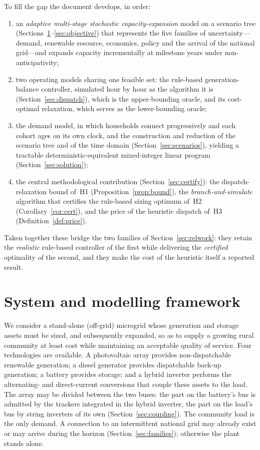 \documentclass[11pt,a4paper]{article}
\theoremstyle{plain}
\theoremstyle{definition}
\begin{document}
To fill the gap the document develops, in order:
\begin{enumerate}[leftmargin=1.8em,itemsep=1pt]
  \item an \emph{adaptive multi-stage stochastic capacity-expansion} model on a scenario
  tree (Sections~\ref{sec:framework}--\ref{sec:objective}) that represents the five
  families of uncertainty---demand, renewable resource, economics, policy and the arrival
  of the national grid---and expands capacity incrementally at milestone years under
  non-anticipativity;
  \item two operating models sharing one feasible set: the rule-based generation-balance
  controller, simulated hour by hour as the algorithm it is (Section~\ref{sec:dispatch}),
  which is the upper-bounding oracle, and its cost-optimal relaxation, which serves as the
  lower-bounding oracle;
  \item the demand model, in which households connect progressively and each cohort ages on
  its own clock, and the construction and reduction of the scenario tree and of the time
  domain (Section~\ref{sec:scenarios}), yielding a tractable deterministic-equivalent
  mixed-integer linear program (Section~\ref{sec:solution});
  \item the central methodological contribution (Section~\ref{sec:certify}): the
  dispatch-relaxation bound of~H1 (Proposition~\ref{prop:bound}), the
  \emph{branch-and-simulate} algorithm that certifies the rule-based sizing optimum
  of~H2 (Corollary~\ref{cor:cert}), and the price of the heuristic dispatch of~H3
  (Definition~\ref{def:price}).
\end{enumerate}
Taken together these bridge the two families of Section~\ref{sec:relwork}: they retain the
\emph{realistic} rule-based controller of the first while delivering the \emph{certified}
optimality of the second, and they make the cost of the heuristic itself a reported
result.

\section{System and modelling framework}
\label{sec:framework}

We consider a stand-alone (off-grid) microgrid whose generation and storage assets
must be sized, and subsequently expanded, so as to supply a growing rural community at
least cost while maintaining an acceptable quality of service. Four technologies are
available. A photovoltaic array provides non-dispatchable renewable generation; a
diesel generator provides dispatchable back-up generation; a
battery provides storage; and a hybrid inverter performs the alternating- and
direct-current conversions that couple these assets to the load. The array may be divided
between the two buses: the part on the battery's bus is admitted by the trackers
integrated in the hybrid inverter, the part on the load's bus by string inverters of its
own (Section~\ref{sec:coupling}). The community load is the only demand. A connection to
an intermittent national grid may already exist or may arrive during the horizon
(Section~\ref{sec:families}); otherwise the plant stands alone.
\end{document}
